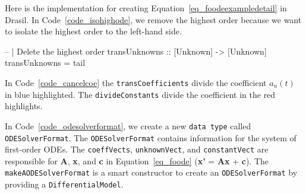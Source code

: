 
Here is the implementation for creating Equation~\ref{eq_foodeexampledetail} in Drasil. In Code~\ref{code_isohighode}, we remove the highest order because we want to isolate the highest order to the left-hand side.
\begin{listing}[ht]
\begin{haskell1}
-- | Delete the highest order
transUnknowns :: [Unknown] -> [Unknown]
transUnknowns = tail
\end{haskell1}
\label{code_isohighode}
\end{listing}

In Code~\ref{code_cancelcoe} the \verb|transCoefficients| divide the coefficient $a_n(t)$ in blue highlighted. The \verb|divideConstants| divide the coefficient in the red highlights.
\begin{listing}[ht]
\label{code_cancelcoe}
\end{listing}

In Code~\ref{code_odesolverformat}, we create a new \verb|data type| called \verb|ODESolverFormat|. The \verb|ODESolverFormat| contains information for the system of first-order ODEs. The \verb|coeffVects|, \verb|unknownVect|, and \verb|constantVect| are responsible for \textbf{A}, \textbf{x}, and \textbf{c} in Equation~\ref{eq_foode} (\textbf{x'} = \textbf{Ax} + \textbf{c}). The \verb|makeAODESolverFormat| is a smart constructor to create an \verb|ODESolverFormat| by providing a \verb|DifferentialModel|.

